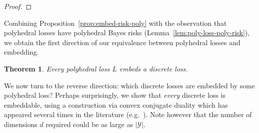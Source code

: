 \documentclass[12pt]{article}
\newcommand{\Comments}{1}
\newcommand{\mynote}[2]{\ifnum\Comments=1\textcolor{#1}{#2}\fi}
\newcommand{\mytodo}[2]{\ifnum\Comments=1%
  \todo[linecolor=#1!80!black,backgroundcolor=#1,bordercolor=#1!80!black]{#2}\fi}
\newcommand{\raf}[1]{\mynote{green}{[RF: #1]}}
\newcommand{\raft}[1]{\mytodo{green!20!white}{RF: #1}}
\newcommand{\prop}[1]{\mathrm{prop}[#1]}
\newcommand{\simplex}{\Delta_\Y}
\newcommand{\U}{\mathcal{U}}
\newcommand{\Y}{\mathcal{Y}}
\newcommand{\risk}[1]{\underline{#1}}
\newcommand{\inter}[1]{\mathring{#1}}%
\DeclareMathOperator*{\argmin}{arg\,min}
\newtheorem{theorem}{Theorem}
\begin{document}
\begin{proof}
\end{proof}

Combining Proposition~\ref{prop:embed-risk-poly} with the observation that polyhedral losses have polyhedral Bayes risks (Lemma~\ref{lem:poly-loss-poly-risk}), we obtain the first direction of our equivalence between polyhedral losses and embedding.

\begin{theorem}\label{thm:poly-embeds-discrete}
  Every polyhedral loss $L$ embeds a discrete loss.
\end{theorem}

We now turn to the reverse direction: which discrete losses are embedded by some polyhedral loss?
Perhaps surprisingly, we show that \emph{every} discrete loss is embeddable,
using a construction via convex conjugate duality which has appeared several times in the literature (e.g.\ \cite{duchi2018multiclass,abernethy2013efficient,frongillo2014general}).
Note however that the number of dimensions $d$ required could be as large as $|\Y|$.
\end{document}
